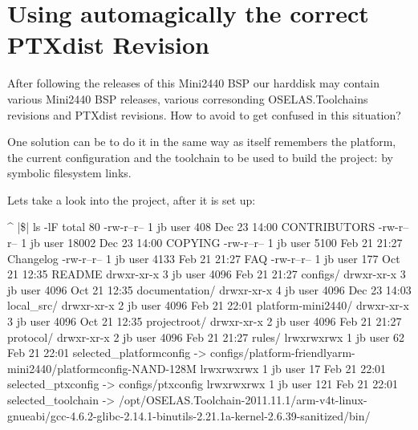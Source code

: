 %
%
%
%
%
%
%

\section{Using automagically the correct PTXdist Revision}	\label{sec:ptxdistreleases}

After following the releases of this Mini2440 BSP our harddisk may contain
various Mini2440 BSP releases, various corresonding OSELAS.Toolchains revisions
and PTXdist revisions. How to avoid to get confused in this situation?

One solution can be to do it in the same way as \ptxdist{} itself remembers the
platform, the current configuration and the toolchain to be used to build the
project: by symbolic filesystem links.

Lets take a look into the project, after it is set up:

\begin{ptxshell}[escapechar=|]{^}
|\$| ls -lF
total 80
-rw-r--r-- 1 jb user   408 Dec 23 14:00 CONTRIBUTORS
-rw-r--r-- 1 jb user 18002 Dec 23 14:00 COPYING
-rw-r--r-- 1 jb user  5100 Feb 21 21:27 Changelog
-rw-r--r-- 1 jb user  4133 Feb 21 21:27 FAQ
-rw-r--r-- 1 jb user   177 Oct 21 12:35 README
drwxr-xr-x 3 jb user  4096 Feb 21 21:27 configs/
drwxr-xr-x 3 jb user  4096 Oct 21 12:35 documentation/
drwxr-xr-x 4 jb user  4096 Dec 23 14:03 local_src/
drwxr-xr-x 2 jb user  4096 Feb 21 22:01 platform-mini2440/
drwxr-xr-x 3 jb user  4096 Oct 21 12:35 projectroot/
drwxr-xr-x 2 jb user  4096 Feb 21 21:27 protocol/
drwxr-xr-x 2 jb user  4096 Feb 21 21:27 rules/
lrwxrwxrwx 1 jb user    62 Feb 21 22:01 selected_platformconfig -> configs/platform-friendlyarm-mini2440/platformconfig-NAND-128M
lrwxrwxrwx 1 jb user    17 Feb 21 22:01 selected_ptxconfig -> configs/ptxconfig
lrwxrwxrwx 1 jb user   121 Feb 21 22:01 selected_toolchain -> /opt/OSELAS.Toolchain-2011.11.1/arm-v4t-linux-gnueabi/gcc-4.6.2-glibc-2.14.1-binutils-2.21.1a-kernel-2.6.39-sanitized/bin/
\end{ptxshell}

